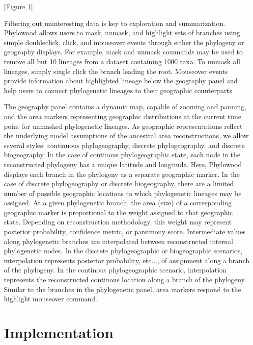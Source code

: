 \documentclass[11pt]{article}
\begin{document}
\begin{center}
[Figure 1]
\end{center}

Filtering out uninteresting data is key to exploration and summarization. Phylowood allows users to mask, unmask, and highlight sets of branches using simple doubleclick, click, and mouseover events through either the phylogeny or geography displays. For example, mask and unmask commands may be used to remove all but 10 lineages from a dataset containing 1000 taxa. To unmask all lineages, simply single click the branch leading the root. Mouseover events provide information about highlighted lineage below the geography panel and help users to connect phylogenetic lineages to their geographic counterparts.

The geography panel contains a dynamic map, capable of zooming and panning, and the area markers representing geographic distributions at the current time point for unmasked phylogenetic lineages. As geographic representations reflect the underlying model assumptions of the ancestral area reconstructions, we allow several styles: continuous phylogeography, discrete phylogeography, and discrete biogeography. In the case of continous phylogeographic state, each node in the reconstructed phylogeny has a unique latitude and longitude. Here, Phylowood displays each branch in the phylogeny as a separate geographic marker. In the case of discrete phylogeography or discrete biogeography, there are a limited number of possible geographic locations to which phylogenetic lineages may be assigned. At a given phylogenetic branch, the area (size) of a corresponding geographic marker is proportional to the weight assigned to that geographic state. Depending on reconstruction methodology, this weight may represent posterior probability, confidence metric, or parsimony score. Intermediate values along phylogenetic branches are interpolated between reconstructed internal phylogenetic nodes. In the discrete phylogeographic or biogeographic scenarios, interpolation represents posterior probability, etc..., of assignment along a branch of the phylogeny. In the continous phylogeographic scenario, interpolation represents the reconstructed continous location along a branch of the phylogeny. Similar to the branches in the phylogenetic panel, area markers respond to the highlight mouseover command.

\section{Implementation}
\end{document}
